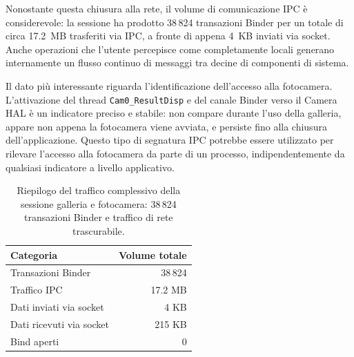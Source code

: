 Nonostante questa chiusura alla rete, il volume di comunicazione IPC è considerevole: la sessione ha prodotto 38\,824 transazioni Binder per un totale di circa 17.2~MB trasferiti via IPC, a fronte di appena 4~KB inviati via socket. Anche operazioni che l'utente percepisce come completamente locali generano internamente un flusso continuo di messaggi tra decine di componenti di sistema.

Il dato più interessante riguarda l'identificazione dell'accesso alla fotocamera. L'attivazione del thread \texttt{Cam0\_ResultDisp} e del canale Binder verso il Camera HAL è un indicatore preciso e stabile: non compare durante l'uso della galleria, appare non appena la fotocamera viene avviata, e persiste fino alla chiusura dell'applicazione. Questo tipo di segnatura IPC potrebbe essere utilizzato per rilevare l'accesso alla fotocamera da parte di un processo, indipendentemente da qualsiasi indicatore a livello applicativo.

\begin{table}[h]
\centering
\begin{tabular}{lr}
\toprule
\textbf{Categoria} & \textbf{Volume totale} \\
\midrule
Transazioni Binder & 38\,824 \\
Traffico IPC & 17.2 MB \\
Dati inviati via socket & 4 KB \\
Dati ricevuti via socket & 215 KB \\
Bind aperti & 0 \\
\bottomrule
\end{tabular}
\caption{Riepilogo del traffico complessivo della sessione galleria e fotocamera: 38\,824 transazioni Binder e traffico di rete trascurabile.}
\end{table}
